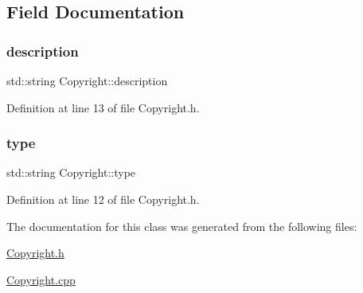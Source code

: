 \subsection{Field Documentation}
\mbox{\label{class_copyright_a80d81f20307c55080670a07ccdd0ead1}} 
\subsubsection{\texorpdfstring{description}{description}}
{\footnotesize\ttfamily std\+::string Copyright\+::description\hspace{0.3cm}{\ttfamily [private]}}



Definition at line 13 of file Copyright.\+h.

\mbox{\label{class_copyright_a7ff74e20aebd2c5987bafa31281609fa}} 
\subsubsection{\texorpdfstring{type}{type}}
{\footnotesize\ttfamily std\+::string Copyright\+::type\hspace{0.3cm}{\ttfamily [private]}}



Definition at line 12 of file Copyright.\+h.



The documentation for this class was generated from the following files\+:\begin{DoxyCompactItemize}
\item 
\mbox{\hyperlink{_copyright_8h}{Copyright.\+h}}\item 
\mbox{\hyperlink{_copyright_8cpp}{Copyright.\+cpp}}\end{DoxyCompactItemize}
